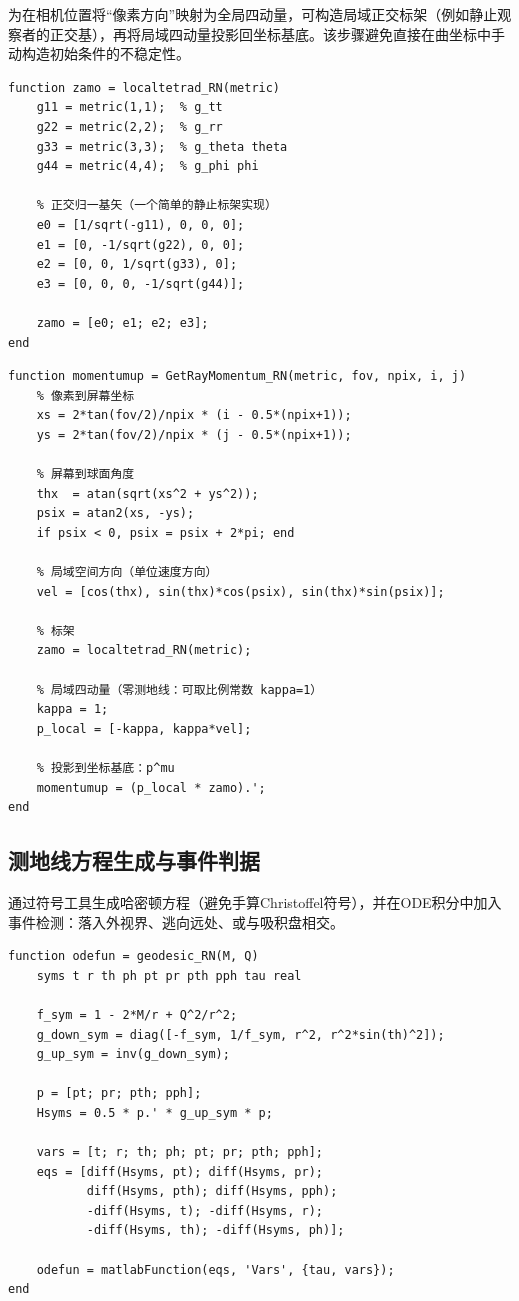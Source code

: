 \documentclass[a4paper,12pt]{article}
\begin{document}
为在相机位置将“像素方向”映射为全局四动量，可构造局域正交标架（例如静止观察者的正交基），再将局域四动量投影回坐标基底。该步骤避免直接在曲坐标中手动构造初始条件的不稳定性。

\begin{lstlisting}[caption={局域正交标架 \texttt{localtetrad\_RN}}]
function zamo = localtetrad_RN(metric)
    g11 = metric(1,1);  % g_tt
    g22 = metric(2,2);  % g_rr
    g33 = metric(3,3);  % g_theta theta
    g44 = metric(4,4);  % g_phi phi

    % 正交归一基矢（一个简单的静止标架实现）
    e0 = [1/sqrt(-g11), 0, 0, 0];
    e1 = [0, -1/sqrt(g22), 0, 0];
    e2 = [0, 0, 1/sqrt(g33), 0];
    e3 = [0, 0, 0, -1/sqrt(g44)];

    zamo = [e0; e1; e2; e3];
end
\end{lstlisting}

\begin{lstlisting}[caption={像素到初始四动量映射 \texttt{GetRayMomentum\_RN}}]
function momentumup = GetRayMomentum_RN(metric, fov, npix, i, j)
    % 像素到屏幕坐标
    xs = 2*tan(fov/2)/npix * (i - 0.5*(npix+1));
    ys = 2*tan(fov/2)/npix * (j - 0.5*(npix+1));

    % 屏幕到球面角度
    thx  = atan(sqrt(xs^2 + ys^2));
    psix = atan2(xs, -ys);
    if psix < 0, psix = psix + 2*pi; end

    % 局域空间方向（单位速度方向）
    vel = [cos(thx), sin(thx)*cos(psix), sin(thx)*sin(psix)];

    % 标架
    zamo = localtetrad_RN(metric);

    % 局域四动量（零测地线：可取比例常数 kappa=1）
    kappa = 1;
    p_local = [-kappa, kappa*vel];

    % 投影到坐标基底：p^mu
    momentumup = (p_local * zamo).';
end
\end{lstlisting}

\subsection{测地线方程生成与事件判据}

通过符号工具生成哈密顿方程（避免手算Christoffel符号），并在ODE积分中加入事件检测：落入外视界、逃向远处、或与吸积盘相交。

\begin{lstlisting}[caption={测地线方程生成 \texttt{geodesic\_RN}}]
function odefun = geodesic_RN(M, Q)
    syms t r th ph pt pr pth pph tau real

    f_sym = 1 - 2*M/r + Q^2/r^2;
    g_down_sym = diag([-f_sym, 1/f_sym, r^2, r^2*sin(th)^2]);
    g_up_sym = inv(g_down_sym);

    p = [pt; pr; pth; pph];
    Hsyms = 0.5 * p.' * g_up_sym * p;

    vars = [t; r; th; ph; pt; pr; pth; pph];
    eqs = [diff(Hsyms, pt); diff(Hsyms, pr);
           diff(Hsyms, pth); diff(Hsyms, pph);
           -diff(Hsyms, t); -diff(Hsyms, r);
           -diff(Hsyms, th); -diff(Hsyms, ph)];

    odefun = matlabFunction(eqs, 'Vars', {tau, vars});
end
\end{lstlisting}
\end{document}
